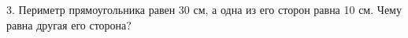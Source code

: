 3. Периметр прямоугольника равен 30 см, а одна из его сторон равна 10 см. Чему равна другая его сторона?\\
